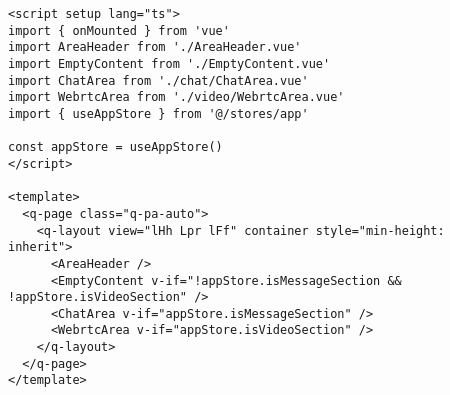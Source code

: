 \begin{lstlisting}[style=typescript, caption={Definizione Components}, label=lst:component]
<script setup lang="ts">
import { onMounted } from 'vue'
import AreaHeader from './AreaHeader.vue'
import EmptyContent from './EmptyContent.vue'
import ChatArea from './chat/ChatArea.vue'
import WebrtcArea from './video/WebrtcArea.vue'
import { useAppStore } from '@/stores/app'

const appStore = useAppStore()
</script>

<template>
  <q-page class="q-pa-auto">
    <q-layout view="lHh Lpr lFf" container style="min-height: inherit">
      <AreaHeader />
      <EmptyContent v-if="!appStore.isMessageSection && !appStore.isVideoSection" />
      <ChatArea v-if="appStore.isMessageSection" />
      <WebrtcArea v-if="appStore.isVideoSection" />
    </q-layout>
  </q-page>
</template>
\end{lstlisting}
